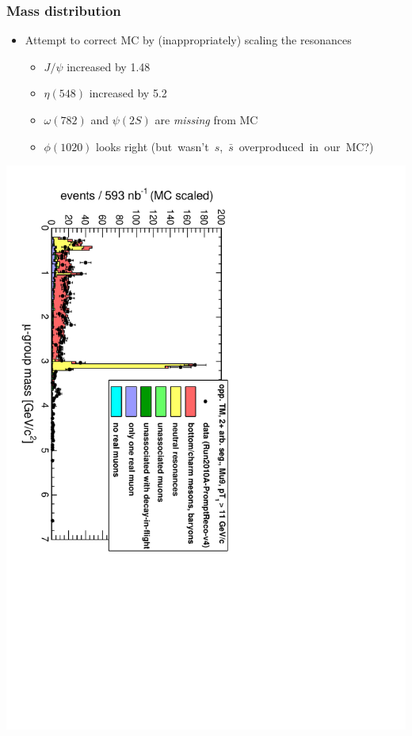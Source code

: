 \documentclass[compress]{beamer}
\begin{document}
\begin{frame}
\frametitle{Mass distribution}
\begin{itemize}
\item Attempt to correct MC by (inappropriately) scaling the resonances
\begin{itemize}
\item $J/\psi$ increased by 1.48
\item $\eta(548)$ increased by 5.2
\item $\omega(782)$ and $\psi(2S)$ are {\it missing} from MC
\item $\phi(1020)$ looks right \mbox{(but wasn't $s$, $\bar{s}$ overproduced in our MC?)\hspace{-1 cm}}
\end{itemize}
\end{itemize}

\vfill
\includegraphics[height=\linewidth, angle=90]{Mu9_mass_scaled.pdf}
\end{frame}
\end{document}
